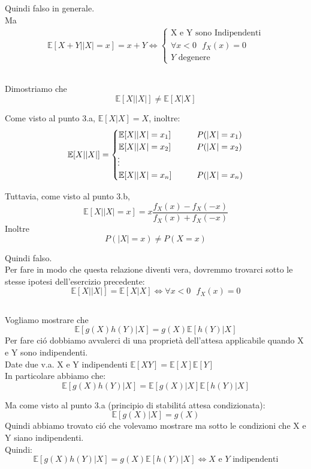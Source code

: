 \documentclass[a4paper]{article}
\newcommand{\E}[0]{\mathbb{E}}
\begin{document}
Quindi falso in generale. \\
Ma 
\begin{align*}
\E[X + Y | |X| = x] = x + Y \iff
	\begin{cases}
        \text{X e Y sono Indipendenti} \\
        \forall x < 0  \ \ \  f_X(x) = 0 \\
        Y \text{ degenere}
	\end{cases}
\end{align*}


\subsection{}
Dimostriamo che 
$$
\E[X||X|] \ne \E[X | X] 
$$

Come visto al punto 3.a,  $\E[X | X] = X$, inoltre:
\begin{align}
	\E[X | |X|]=
	\begin{cases}
		\E[X | |X| = x_1] \qquad & P(|X|=x_1)\\
		\E[X | |X| = x_2] \qquad & P(|X|=x_2)\\
        \vdotswithin{} \notag \\
		\E[X | |X| = x_n] \qquad & P(|X|=x_n)\\
	\end{cases}
\end{align}

Tuttavia, come visto al punto 3.b, 
$$\E[X | |X| = x] = x\frac{f_X(x)-f_X(-x)}{f_X(x) + f_X(-x)}$$
Inoltre
$$P(|X| = x) \ne P(X = x)$$

Quindi falso. \\ 
Per fare in modo che questa relazione diventi vera, dovremmo trovarci sotto le stesse ipotesi dell'esercizio precedente:
$$
\E[X||X|] = \E[X | X] \iff \forall x<0 \ \ \ f_X(x) = 0
$$

\subsection{}
Vogliamo mostrare che
$$\E[g(X)h(Y) | X] = g(X)\E[h(Y) | X]$$
Per fare ció dobbiamo avvalerci di una proprietà dell'attesa applicabile quando X e Y sono indipendenti.\\Date due v.a. X e Y indipendenti $\E[XY]= \E[X]\E[Y]$\\
In particolare abbiamo che:
$$\E[g(X)h(Y) | X] = \E[g(X) | X] \E[h(Y) | X]$$

Ma come visto al punto 3.a (principio di stabilitá attesa condizionata):
$$
\E[g(X) | X] = g(X)
$$
Quindi abbiamo trovato ció che volevamo mostrare ma sotto le condizioni che X e Y siano indipendenti. \\
Quindi:
$$
\E[g(X)h(Y) | X] = g(X)\E[h(Y) | X] \iff X \text{ e } Y \text{ indipendenti}
$$
\end{document}
